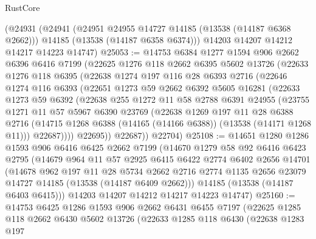 \begin{lexlean}{RustCore}
\begin{coremodule}
    (@24931
      (@24941
        (@24951 @24955 @14727 @14185 (@13538 (@14187 @6368 @2662)))
        @14185
        (@13538 (@14187 @6358 @6374)))
      @14203
      @14207
      @14212
      @14217
      @14223
      @14747)
@25053 := @14753
    @6384
    @1277
    @1594
    @906
    @2662
    @6396
    @6416
    @7199
    (@22625
      @1276
      @118
      @2662
      @6395
      @5602
      @13726
      (@22633
        @1276
        @118
        @6395
        (@22638
          @1274
          @197
          @116
          @28
          @6393
          @2716
          (@22646
            @1274
            @116
            @6393
            (@22651
              @1273
              @59
              @2662
              @6392
              @5605
              @16281
              (@22633
                @1273
                @59
                @6392
                (@22638
                  @255
                  @1272
                  @11
                  @58
                  @2788
                  @6391
                  @24955
                  (@23755
                    @1271
                    @11
                    @57
                    @5967
                    @6390
                    @23769
                    (@22638
                      @1269
                      @197
                      @11
                      @28
                      @6388
                      @2716
                      (@14715 @1268 @6388 (@14165 (@14166 @6388)) (@13538 (@14171 @1268 @11)))
                      @22687))))
              @22695))
          @22687))
      @22704)
@25108 := @14651
    @1280
    @1286
    @1593
    @906
    @6416
    @6425
    @2662
    @7199
    (@14670
      @1279
      @58
      @92
      @6416
      @6423
      @2795
      (@14679
        @964
        @11
        @57
        @2925
        @6415
        @6422
        @2774
        @6402
        @2656
        @14701
        (@14678
          @962
          @197
          @11
          @28
          @5734
          @2662
          @2716
          @2774
          @1135
          @2656
          @23079
          @14727
          @14185
          (@13538 (@14187 @6409 @2662)))
        @14185
        (@13538 (@14187 @6403 @6415)))
      @14203
      @14207
      @14212
      @14217
      @14223
      @14747)
@25160 := @14753
    @6425
    @1286
    @1593
    @906
    @2662
    @6431
    @6455
    @7197
    (@22625
      @1285
      @118
      @2662
      @6430
      @5602
      @13726
      (@22633
        @1285
        @118
        @6430
        (@22638
          @1283
          @197

\end{coremodule}
\end{lexlean}
